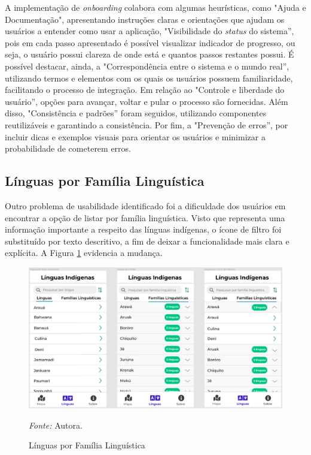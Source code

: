 A implementação de \textit{onboarding} colabora com algumas heurísticas, como "Ajuda e Documentação", apresentando instruções claras e orientações que ajudam os usuários a entender como usar a aplicação, 
"Visibilidade do \textit{status} do sistema'', pois em cada passo apresentado é possível visualizar indicador de progresso, ou seja, o usuário possui clareza de onde está e quantos passos restantes possui. 
É possível destacar, ainda, a "Correspondência entre o sistema e o mundo real'', utilizando termos e elementos com os quais os usuários possuem familiaridade, facilitando o processo de integração. Em 
relação ao "Controle e liberdade do usuário'', opções para avançar, voltar e pular o processo são fornecidas. Além disso, "Consistência e padrões'' foram seguidos, utilizando componentes reutilizáveis e 
garantindo a consistência. Por fim, a "Prevenção de erros'', por incluir dicas e exemplos visuais para orientar os usuários e  minimizar a probabilidade de cometerem erros.

\subsection{Línguas por Família Linguística}
\label{sec:Familia Linguistica}
Outro problema de usabilidade identificado foi a dificuldade dos usuários em encontrar a opção de listar por família linguística. Visto que representa uma informação importante a respeito das línguas indígenas, 
o ícone de filtro foi substituído por texto descritivo, a fim de deixar a funcionalidade mais clara e  explícita. A Figura \ref{fig24} evidencia a mudança.

\begin{figure}[h!]
	\centering
	\caption{Línguas por Família Linguística}
	\begin{adjustbox}{center}
		\includegraphics[width=1\textwidth]{figuras/linguas.eps}
	\end{adjustbox}
		\begin{tablenotes}[flushleft]
		\centering
		\item \textit{Fonte:} Autora.
	\end{tablenotes}
	\label{fig24}
\end{figure}

